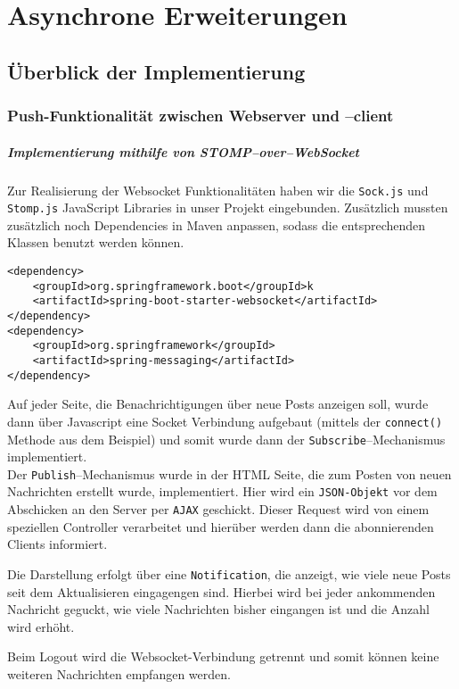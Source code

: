 \chapter{Asynchrone Erweiterungen}
\section{Überblick der Implementierung}
\subsection{Push-Funktionalität zwischen Webserver und --client}
\paragraph{Implementierung mithilfe von STOMP--over--WebSocket}
Zur Realisierung der Websocket Funktionalitäten haben wir die \texttt{Sock.js} und \texttt{Stomp.js} JavaScript Libraries in unser Projekt eingebunden. Zusätzlich mussten zusätzlich noch Dependencies in Maven anpassen, sodass die entsprechenden Klassen benutzt werden können.
\begin{verbatim}
<dependency>
    <groupId>org.springframework.boot</groupId>k
    <artifactId>spring-boot-starter-websocket</artifactId>
</dependency>
<dependency>
    <groupId>org.springframework</groupId>
    <artifactId>spring-messaging</artifactId>
</dependency>
\end{verbatim}

Auf jeder Seite, die Benachrichtigungen über neue Posts anzeigen soll, wurde dann über Javascript eine Socket Verbindung aufgebaut (mittels der \texttt{connect()} Methode aus dem Beispiel) und somit wurde dann der \texttt{Subscribe}--Mechanismus implementiert.\\
Der \texttt{Publish}--Mechanismus wurde in der HTML Seite, die zum Posten von neuen Nachrichten erstellt wurde, implementiert. Hier wird ein \texttt{JSON-Objekt} vor dem Abschicken an den Server per \texttt{AJAX} geschickt. Dieser Request wird von einem speziellen Controller verarbeitet und hierüber werden dann die abonnierenden Clients informiert.

Die Darstellung erfolgt über eine \texttt{Notification}, die anzeigt, wie viele neue Posts seit dem Aktualisieren eingagengen sind. Hierbei wird bei jeder ankommenden Nachricht geguckt, wie viele Nachrichten bisher eingangen ist und die Anzahl wird erhöht.

Beim Logout wird die Websocket-Verbindung getrennt und somit können keine weiteren Nachrichten empfangen werden.

